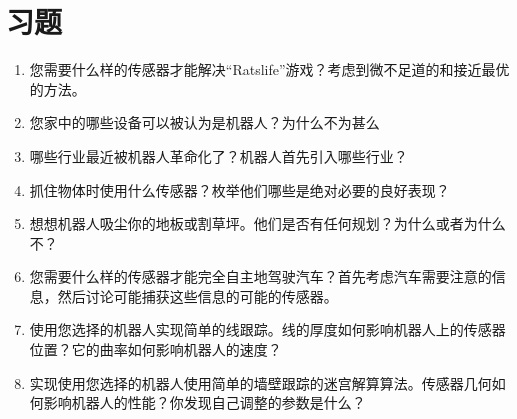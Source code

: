 
\section*{习题}\small
\begin{enumerate}
\item 您需要什么样的传感器才能解决“Ratslife”游戏？考虑到微不足道的和接近最优的方法。
\item 您家中的哪些设备可以被认为是机器人？为什么不为甚么
\item 哪些行业最近被机器人革命化了？机器人首先引入哪些行业？
\item 抓住物体时使用什么传感器？枚举他们哪些是绝对必要的良好表现？
\item 想想机器人吸尘你的地板或割草坪。他们是否有任何规划？为什么或者为什么不？
\item 您需要什么样的传感器才能完全自主地驾驶汽车？首先考虑汽车需要注意的信息，然后讨论可能捕获这些信息的可能的传感器。
\item 使用您选择的机器人实现简单的线跟踪。线的厚度如何影响机器人上的传感器位置？它的曲率如何影响机器人的速度？
\item 实现使用您选择的机器人使用简单的墙壁跟踪的迷宫解算算法。传感器几何如何影响机器人的性能？你发现自己调整的参数是什么？
\end{enumerate}\normalsize


